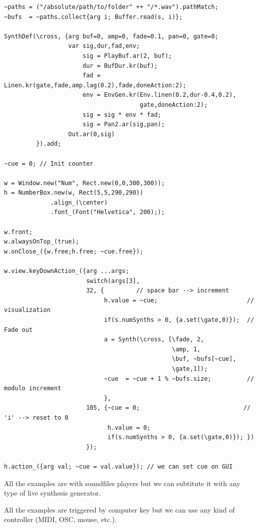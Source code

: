 \begin{lstlisting}[frame=single, caption=playback cues model] 
~paths = ("/absolute/path/to/folder" ++ "/*.wav").pathMatch;
~bufs  = ~paths.collect{arg i; Buffer.read(s, i)};

SynthDef(\cross, {arg buf=0, amp=0, fade=0.1, pan=0, gate=0;
                  var sig,dur,fad,env;
                      sig = PlayBuf.ar(2, buf);
                      dur = BufDur.kr(buf);
                      fad = Linen.kr(gate,fade,amp.lag(0.2),fade,doneAction:2);     
                      env = EnvGen.kr(Env.linen(0.2,dur-0.4,0.2),
                                      gate,doneAction:2);
                      sig = sig * env * fad;
                      sig = Pan2.ar(sig,pan); 
                  Out.ar(0,sig)
         }).add;

~cue = 0; // Init counter

w = Window.new("Num", Rect.new(0,0,300,300));
h = NumberBox.new(w, Rect(5,5,290,290))
             .align_(\center)
             .font_(Font("Helvetica", 200););

w.front;
w.alwaysOnTop_(true);
w.onClose_({w.free;h.free; ~cue.free});

w.view.keyDownAction_({arg ...args;
                       switch(args[3],
                       32, {         // space bar --> increment
                            h.value = ~cue;                         // visualization
                            if(s.numSynths > 0, {a.set(\gate,0)});  // Fade out               
                            a = Synth(\cross, [\fade, 2, 
                                               \amp, 1, 
                                               \buf, ~bufs[~cue],
                                               \gate,1]);
                            ~cue  = ~cue + 1 % ~bufs.size;          // modulo increment
                            },
                       105, {~cue = 0;                             // 'i' --> reset to 0
                             h.value = 0;
                             if(s.numSynths > 0, {a.set(\gate,0)}); })
                       });
					   
h.action_({arg val; ~cue = val.value}); // we can set cue on GUI
\end{lstlisting} 

All the examples are with soundfiles players but we can subtitute it with any type of live synthesis generator.

All the examples are triggered by computer key but we can use any kind of controller (MIDI, OSC, mouse, etc.).

